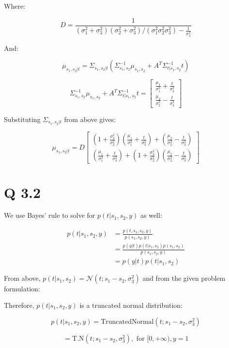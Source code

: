 Where:

\[
D = \frac{1}{\left( \sigma_1^2 + \sigma_3^2 \right) \left( \sigma_2^2 + \sigma_3^2 \right) / \left( \sigma_1^2 \sigma_2^2 \sigma_3^2 \right) - \frac{1}{\sigma_3^2}}
\]

And:

\[
\mu_{s_1, s_2|t} = \Sigma_{s_1, s_2|t} \left( \Sigma_{s_1, s_2}^{-1} \mu_{s_1, s_2} + A^T \Sigma_{t|s_1, s_2}^{-1} t \right)
\]

\[
\Sigma_{s_1, s_2}^{-1} \mu_{s_1, s_2} + A^T \Sigma_{t|s_1, s_2}^{-1} t = \begin{bmatrix} \frac{\mu_1}{\sigma_1^2} + \frac{t}{\sigma_3^2} \\ \frac{\mu_2}{\sigma_2^2} - \frac{t}{\sigma_3^2} \end{bmatrix}
\]

Substituting $\Sigma_{s_1, s_2|t}$ from above gives:

\[
\mu_{s_1, s_2|t} = D \begin{bmatrix} \left( 1 + \frac{\sigma_3^2}{\sigma_2^2} \right) \left( \frac{\mu_1}{\sigma_1^2} + \frac{t}{\sigma_3^2} \right) + \left( \frac{\mu_2}{\sigma_2^2} - \frac{t}{\sigma_3^2} \right) \\ \left( \frac{\mu_1}{\sigma_1^2} + \frac{t}{\sigma_3^2} \right) + \left( 1 + \frac{\sigma_3^2}{\sigma_2^2} \right) \left( \frac{\mu_2}{\sigma_2^2} - \frac{t}{\sigma_3^2} \right) \end{bmatrix}
\]

\section*{Q 3.2}
We use Bayes' rule to solve for $p(t|s_1, s_2, y)$ as well:

\begin{align*}
    p(t|s_1, s_2, y) &= \frac{p(t, s_1, s_2, y)}{p(s_1, s_2, y)} \\
    &= \frac{p(y|t) p(t|s_1, s_2) p(s_1, s_2)}{p(s_1, s_2, y)} \\
    &= p(y|t) p(t|s_1, s_2)
\end{align*}

From above, $p(t|s_1, s_2) = \mathcal{N}\left(t; s_1 - s_2, \sigma_3^2\right)$ and from the given problem formulation:

Therefore, $p(t|s_1, s_2, y)$ is a truncated normal distribution:

\[
p(t|s_1, s_2, y) = \text{TruncatedNormal}(t; s_1 - s_2, \sigma_3^2)
\]

\[
= \text{T.N}\left(t; s_1 - s_2, \sigma_3^2\right), \text{ for } [0, +\infty), y = 1
\]

